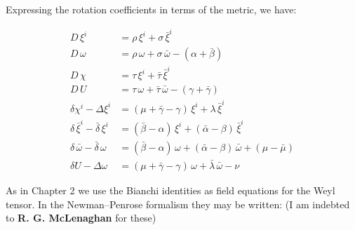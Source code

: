 
Expressing the rotation coefficients in terms of the metric, we have:

\begin{align}
D \, \xi^{i} &= \rho \, \xi^{i} + \sigma \, \bar{\xi}^{i} 
\tag{3.43} \\[10pt]
%
D \, \omega &= \rho \, \omega + \sigma \, \bar{\omega} - (\alpha + \bar{\beta}) 
\tag{3.44} \\[10pt]
%
D \, \chi &= \tau \, \xi^{i} + \bar{\tau} \, \bar{\xi}^{i} 
\tag{3.45} \\[10pt]
%
D \, U &= \tau \, \omega + \bar{\tau} \, \bar{\omega} - (\gamma + \bar{\gamma}) 
\tag{3.46} \\[10pt]
%
\delta \chi^{i} - \Delta \xi^{i} &= (\mu + \bar{\gamma} - \gamma)\, \xi^{i} + \lambda \, \bar{\xi}^{i} 
\tag{3.47} \\[10pt]
%
\delta \, \bar{\xi}^{i} - \bar{\delta} \, \xi^{i} &= (\bar{\beta} - \alpha)\, \xi^{i} + (\bar{\alpha} - \beta)\, \bar{\xi}^{i} 
\tag{3.48} \\[10pt]
%
\delta \, \bar{\omega} - \bar{\delta} \, \omega &= (\bar{\beta} - \alpha)\, \omega + (\bar{\alpha} - \beta)\, \bar{\omega} + (\mu - \bar{\mu}) 
\tag{3.49} \\[10pt]
%
\delta U - \Delta \omega &= (\mu + \bar{\gamma} - \gamma)\, \omega + \bar{\lambda} \, \bar{\omega} - \nu 
\tag{3.50}
\end{align}



As in Chapter 2 we use the Bianchi identities as field equations for the Weyl tensor.  
In the Newman–Penrose formalism they may be written:  
(I am indebted to \textbf{R. G. McLenaghan} for these)

